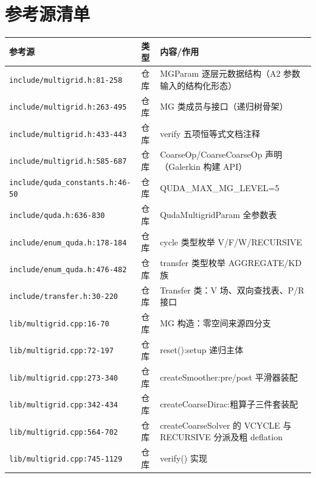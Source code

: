 \documentclass[UTF8]{ctexart}
\begin{document}


\section{参考源清单}\label{sec:refs}

\begin{xltabular}{\textwidth}{llX}
\toprule
\textcolor{evidence}{参考源} & 类型 & 内容/作用 \\
\midrule
\endhead
\texttt{\nolinkurl{include/multigrid.h:81-258}} & 仓库 & MGParam 逐层元数据结构（A2 参数输入的结构化形态） \\
\texttt{\nolinkurl{include/multigrid.h:263-495}} & 仓库 & MG 类成员与接口（递归树骨架） \\
\texttt{\nolinkurl{include/multigrid.h:433-443}} & 仓库 & verify 五项恒等式文档注释 \\
\texttt{\nolinkurl{include/multigrid.h:585-687}} & 仓库 & CoarseOp/CoarseCoarseOp 声明（Galerkin 构建 API） \\
\texttt{\nolinkurl{include/quda_constants.h:46-50}} & 仓库 & QUDA\_MAX\_MG\_LEVEL=5 \\
\texttt{\nolinkurl{include/quda.h:636-830}} & 仓库 & QudaMultigridParam 全参数表 \\
\texttt{\nolinkurl{include/enum_quda.h:178-184}} & 仓库 & cycle 类型枚举 V/F/W/RECURSIVE \\
\texttt{\nolinkurl{include/enum_quda.h:476-482}} & 仓库 & transfer 类型枚举 AGGREGATE/KD 族 \\
\texttt{\nolinkurl{include/transfer.h:30-220}} & 仓库 & Transfer 类：V 场、双向查找表、P/R 接口 \\
\texttt{\nolinkurl{lib/multigrid.cpp:16-70}} & 仓库 & MG 构造：零空间来源四分支 \\
\texttt{\nolinkurl{lib/multigrid.cpp:72-197}} & 仓库 & reset():setup 递归主体 \\
\texttt{\nolinkurl{lib/multigrid.cpp:273-340}} & 仓库 & createSmoother:pre/post 平滑器装配 \\
\texttt{\nolinkurl{lib/multigrid.cpp:342-434}} & 仓库 & createCoarseDirac:粗算子三件套装配 \\
\texttt{\nolinkurl{lib/multigrid.cpp:564-702}} & 仓库 & createCoarseSolver 的 VCYCLE 与 RECURSIVE 分派及粗 deflation \\
\texttt{\nolinkurl{lib/multigrid.cpp:745-1129}} & 仓库 & verify() 实现 \\

\end{xltabular}
\end{document}
